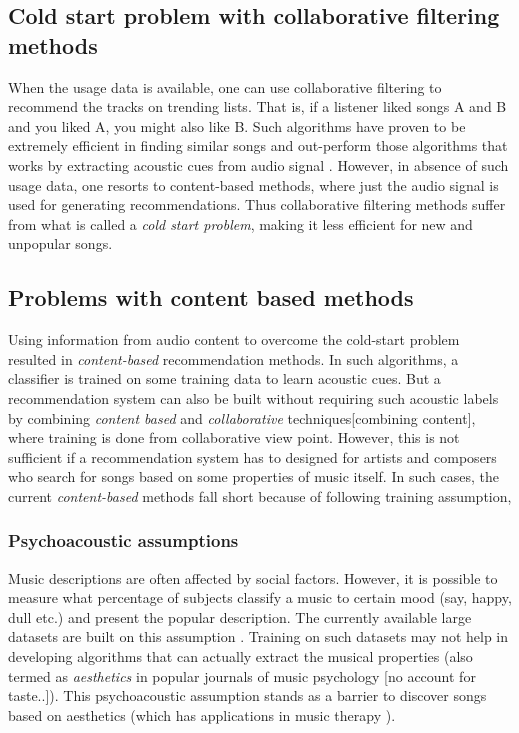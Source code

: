 \subsection{Cold start problem with collaborative filtering methods}
When the usage data is available, one can use collaborative filtering to recommend the tracks on trending lists. That is, if a listener liked songs A and B and you liked A, you might also like B. Such algorithms have proven to be extremely efficient in finding similar songs and out-perform those algorithms that works by extracting acoustic cues from audio signal \cite{DC1}. However, in absence of such usage data, one resorts to content-based methods, where just the audio signal is used for generating recommendations. Thus collaborative filtering methods suffer from what is called a \textit{cold start problem}, making it less efficient for new and unpopular songs. 


\subsection{Problems with content based methods}
\label{problems}
Using information from audio content to overcome the cold-start problem resulted in \textit{content-based} recommendation methods. In such algorithms, a classifier is trained on some training data to learn acoustic cues. But a recommendation system can also be built without requiring  such acoustic labels by combining \textit{content based} and \textit{collaborative} techniques[combining content], where training is done from collaborative view point. However, this is not sufficient if a recommendation system has to designed for artists and composers who search for songs based on some properties of music itself. In such cases, the current \textit{content-based} methods fall short because of following training assumption,   

\subsubsection{Psychoacoustic assumptions}
Music descriptions are often affected by social factors. However, it is possible to measure what percentage of subjects classify a music to certain mood (say, happy, dull etc.) and present the popular description. The currently available large datasets are built on this assumption \cite{MSD}\cite{MTT}.  Training on such datasets may not help in developing algorithms that can actually extract the musical properties (also termed as \textit{aesthetics} in popular journals of music psychology [no account for taste..]). This psychoacoustic assumption stands as a barrier to discover songs based on aesthetics (which has applications in music therapy \cite{MusicTherapy}).

